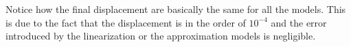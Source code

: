 Notice how the final displacement are basically the same for all the models.
This is due to the fact that the displacement is in the order of $10^{-4}$ and the error introduced by the linearization or the approximation models is negligible.




